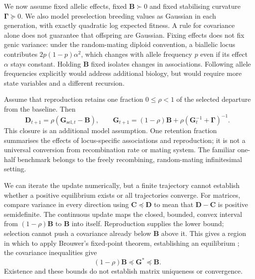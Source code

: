We now assume fixed allelic effects, fixed $\mathbf B\succ0$ and fixed
stabilising curvature $\boldsymbol\Gamma\succeq0$. We also model
preselection breeding values as Gaussian in each generation, with exactly
quadratic log expected fitness. A rule for covariance alone does not
guarantee that offspring are Gaussian. Fixing effects does not fix genic
variance: under the random-mating diploid convention, a biallelic locus
contributes $2p(1-p)\alpha^2$, which changes with allele frequency $p$ even
if its effect $\alpha$ stays constant.
Holding $\mathbf B$ fixed isolates changes in associations. Following
allele frequencies explicitly would address additional biology, but would
require more state variables and a different recursion.

Assume that reproduction retains one fraction $0\leq\rho<1$ of the selected
departure from the baseline. Then
\begin{equation}
 \mathbf D_{t+1}=\rho(\mathbf G_{\mathrm{sel},t}-\mathbf B),
 \qquad
 \mathbf G_{t+1}
   =(1-\rho)\mathbf B
      +\rho(\mathbf G_t^{-1}+\boldsymbol\Gamma)^{-1}.
 \label{companion:eq:inheritance}
\end{equation}
This closure is an additional model assumption. One retention fraction
summarises the effects of locus-specific associations and reproduction;
it is not a universal conversion from recombination rate or mating system.
The familiar one-half benchmark belongs to the freely recombining,
random-mating infinitesimal setting.

We can iterate the update numerically, but a finite trajectory cannot
establish whether a positive equilibrium exists or all trajectories
converge. For matrices, compare variance in every direction using
$\mathbf C\preceq\mathbf D$ to mean that
$\mathbf D-\mathbf C$ is positive semidefinite. The continuous update maps
the closed, bounded, convex interval from $(1-\rho)\mathbf B$ to
$\mathbf B$ into itself. Reproduction supplies the lower bound; selection
cannot push a covariance already below $\mathbf B$ above it. This gives a
region in which to apply Brouwer's fixed-point theorem, establishing an
equilibrium \citep{GranasDugundji2003}; the covariance inequalities give
\begin{equation}
 (1-\rho)\mathbf B\preceq\mathbf G^*\preceq\mathbf B.
 \label{companion:eq:bounds}
\end{equation}
Existence and these bounds do not establish matrix uniqueness or
convergence.

